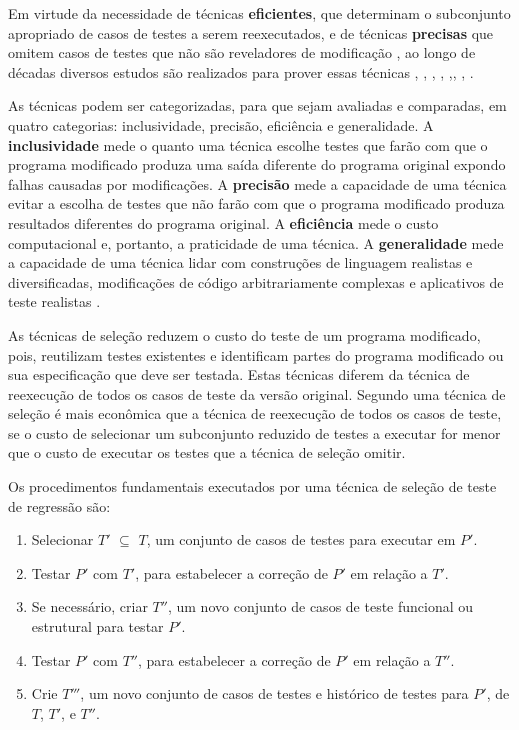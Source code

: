 Em virtude da necessidade de técnicas \textbf{eficientes}, que determinam o subconjunto apropriado de casos de testes a serem reexecutados, e de técnicas \textbf{precisas} que omitem casos de testes que não são reveladores de modificação \cite{Ammann:2008:IST:1355340}, ao longo de décadas diversos estudos são realizados para prover essas técnicas \cite{WHITE1991}, \cite{Graves:2001:ESR:367008.367020}, \cite{630875}, \cite{536955}, \cite{ENGSTROM201014},\cite{ENGSTROM201014}, \cite{KAZMI2017}, \cite{ROMANO201862}.

As técnicas podem ser categorizadas, para que sejam avaliadas e comparadas, em quatro categorias: inclusividade, precisão, eficiência e generalidade. A \textbf{inclusividade} mede o quanto uma técnica escolhe testes que farão com que o programa modificado produza uma saída diferente do programa original expondo falhas causadas por modificações. A \textbf{precisão} mede a capacidade de uma técnica evitar a escolha de testes que não farão com que o programa modificado produza resultados diferentes do programa original. A \textbf{eficiência} mede o custo computacional e, portanto, a praticidade de uma técnica. A \textbf{generalidade} mede a capacidade de uma técnica lidar com construções de linguagem realistas e diversificadas, modificações de código arbitrariamente complexas e aplicativos de teste realistas \cite{536955}.

As técnicas de seleção reduzem o custo do teste de um programa modificado, pois, reutilizam testes existentes e identificam partes do programa modificado ou sua especificação que deve ser testada. Estas técnicas diferem da técnica de reexecução de todos os casos de teste da versão original. Segundo  uma técnica de seleção é mais econômica que a técnica de reexecução de todos os casos de teste, se o custo de selecionar um subconjunto reduzido de testes a executar for menor que o custo de executar os testes que a técnica de seleção omitir.

Os procedimentos fundamentais executados por uma técnica de seleção de teste de regressão são: \cite{536955}

\begin{enumerate}
    \item Selecionar $T'$ $\subseteq$ $T$, um conjunto de casos de testes para executar em $P'$.
    \item Testar $P'$ com $T'$, para estabelecer a correção de $P'$ em relação a $T'$.
    \item Se necessário, criar $T''$, um novo conjunto de casos de teste funcional ou estrutural para testar $P'$.
    \item Testar $P'$ com $T''$, para estabelecer a correção de $P'$ em relação a $T''$.
    \item Crie $T'''$, um novo conjunto de casos de testes e histórico de testes para $P'$, de $T$, $T'$, e $T''$.
\end{enumerate}

